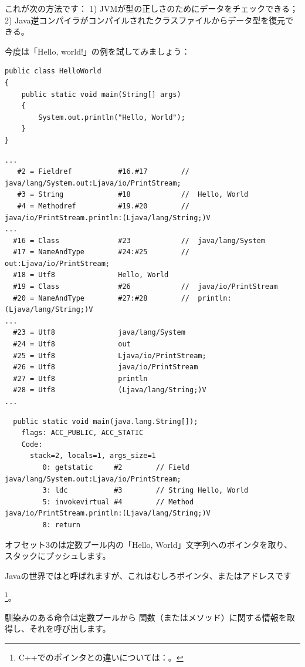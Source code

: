 これが次の方法です：
1) JVMが型の正しさのためにデータをチェックできる；
2) Java逆コンパイラがコンパイルされたクラスファイルからデータ型を復元できる。

今度は「Hello, world!」の例を試してみましょう：

\begin{lstlisting}[style=customjava]
public class HelloWorld
{
	public static void main(String[] args)
	{
		System.out.println("Hello, World");
	}
}
\end{lstlisting}

\begin{lstlisting}[caption=定数プール]
...
   #2 = Fieldref           #16.#17        //  java/lang/System.out:Ljava/io/PrintStream;
   #3 = String             #18            //  Hello, World
   #4 = Methodref          #19.#20        //  java/io/PrintStream.println:(Ljava/lang/String;)V
...
  #16 = Class              #23            //  java/lang/System
  #17 = NameAndType        #24:#25        //  out:Ljava/io/PrintStream;
  #18 = Utf8               Hello, World
  #19 = Class              #26            //  java/io/PrintStream
  #20 = NameAndType        #27:#28        //  println:(Ljava/lang/String;)V
...
  #23 = Utf8               java/lang/System
  #24 = Utf8               out
  #25 = Utf8               Ljava/io/PrintStream;
  #26 = Utf8               java/io/PrintStream
  #27 = Utf8               println
  #28 = Utf8               (Ljava/lang/String;)V
...
\end{lstlisting}

\begin{lstlisting}
  public static void main(java.lang.String[]);
    flags: ACC_PUBLIC, ACC_STATIC
    Code:
      stack=2, locals=1, args_size=1
         0: getstatic     #2        // Field java/lang/System.out:Ljava/io/PrintStream;
         3: ldc           #3        // String Hello, World
         5: invokevirtual #4        // Method java/io/PrintStream.println:(Ljava/lang/String;)V
         8: return        
\end{lstlisting}

オフセット3のは定数プール内の「Hello, World」文字列へのポインタを取り、
スタックにプッシュします。

Javaの世界ではと呼ばれますが、これはむしろポインタ、またはアドレスです

\footnote{C++でのポインタとの違いについては：。}。

馴染みのある命令は定数プールから
関数（またはメソッド）に関する情報を取得し、それを呼び出します。

